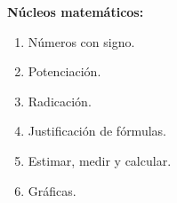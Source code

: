 \documentclass[11pt]{article}
\begin{document}
\textbf{N\'ucleos matem\'aticos:}

\begin{enumerate}
\setlength\itemsep{-0.4em}
    \item N\'umeros con signo.
    \item Potenciaci\'on.
    \item Radicaci\'on.
    \item Justificaci\'on de f\'ormulas.
    \item Estimar, medir y calcular.
    \item Gr\'aficas.
\end{enumerate}
\end{document}
